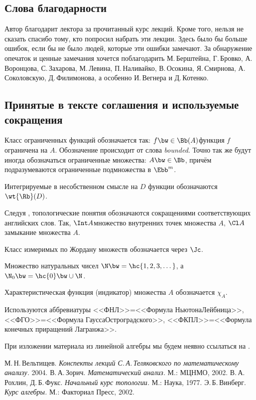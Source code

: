 \documentclass[a4paper]{article}
\newcommand{\Rbt}{\wt{\Rb}}
\begin{document}
\subsection*{Слова благодарности}
Автор благодарит лектора за прочитанный курс лекций. Кроме того, нельзя не сказать
спасибо тому, кто попросил набрать эти лекции. Здесь было бы больше ошибок,
если бы не было людей, которые эти ошибки замечают. За обнаружение опечаток и ценные замечания
хочется поблагодарить М.\,Берштейна, Г.\,Бровко, А.\,Воронцова, С.\,Захарова, М.\,Левина,
П.\,Наливайко, В.\,Осокина, Я.\,Смирнова, А.\,Соколовскую, Д.\,Филимонова,
а особенно И.\,Вегнера и Д.\,Котенко.

\subsection*{Принятые в тексте соглашения и используемые сокращения}

\begin{points}{-3}
\item Класс ограниченных функций обозначается так: $f \bw\in \Bb(A)$\т функция $f$ ограничена на
      $A$. Обозначение происходит от слова \emph{bounded}. Точно так же будут иногда обозначаться
      ограниченные множества: $A \bw\in \Bb$, причём подразумеваются ограниченные подмножества в $\Ebb^m$.
\item Интегрируемые в несобственном смысле на $D$ функции обозначаются $\Rbt(D)$.
\item Следуя \cite{rokhlin}, топологические понятия обозначаются сокращениями соответствующих английских слов.
      Так, $\Int A$\т множество внутренних точек множества $A$, $\Cl A$\т замыкание множества $A$.
\item Класс измеримых по Жордану множеств обозначается через $\Jc$.
\item Множество натуральных чисел $\N \bw= \hc{1,2,3,\dots}$, а $\N_0 \bw= \hc{0} \bw\cup \N$.
\item Характеристическая функция (индикатор) множества $A$ обозначается $\chi_A$.
\item Используются аббревиатуры <<ФНЛ>>=<<Формула Ньютона\ч Лейбница>>,
      <<ФГО>>=<<Формула Гаусса\ч Остроградского>>, <<ФКПЛ>>=<<Формула конечных приращений Лагранжа>>.
\item При изложении материала из линейной алгебры мы будем неявно ссылаться на \cite{vinberg}.
\end{points}

\begin{thebibliography}{4}
\setlength\itemsep{-.5mm}
М.\,Н.\,Вельтищев. \emph{Конспекты лекций С.\,А.\,Теляковского по математическому анализу.} 2004.
В.\,А.\,Зорич. \emph{Математический анализ.} М.: МЦНМО, 2002.
В.\,А.\,Рохлин, Д.\,Б.\,Фукс. \emph{Начальный курс топологии.} М.: Наука, 1977.
Э.\,Б.\,Винберг. \emph{Курс алгебры.} М.: Факториал Пресс, 2002.
\end{thebibliography}
\end{document}
